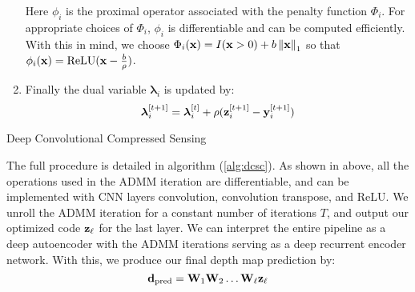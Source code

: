 \begin{enumerate}
  Here $\phi_i$ is the proximal operator associated with the penalty function $\Phi_i$. For appropriate choices of $\Phi_i$, $\phi_i$ is differentiable and can be computed efficiently. With this in mind, we choose $\Phi_i(\mathbf{x}) = I(\mathbf{x} > 0) + b\left\Vert\mathbf{x}\right\Vert_1$ so that $\phi_i(\mathbf{x}) = \text{ReLU}(\mathbf{x} - \frac{b}{\rho})$.
\item Finally the dual variable $\bm{\lambda}_i$ is updated by:
  \begin{equation}
    \label{eq:lupdate}
    \bm{\lambda}_i^{[t+1]} = \bm{\lambda}_i^{[t]} + \rho(\mathbf{z}_i^{[t+1]} - \mathbf{y}_i^{[t+1]})
  \end{equation}
\end{enumerate}
\begin{algorithm}
  \caption{Deep Convolutional Compressed Sensing}
  \label{alg:dcsc}
\end{algorithm}

The full procedure is detailed in algorithm (\ref{alg:dcsc}).
As shown in above, all the operations used in the ADMM iteration are differentiable, and can be implemented with CNN layers \eg convolution, convolution transpose, and ReLU. We unroll the ADMM iteration for a constant number of iterations $T$, and output our optimized code $\mathbf{z}_\ell$ for the last layer.
We can interpret the entire pipeline as a deep autoencoder with the ADMM iterations serving as a deep recurrent encoder network.
With this, we produce our final depth map prediction by:
\begin{equation}
  \label{eq:recon}
  \mathbf{d}_\text{pred} = \mathbf{W}_1\mathbf{W}_2\ldots \mathbf{W}_{\ell}\mathbf{z}_{\ell}
\end{equation}


